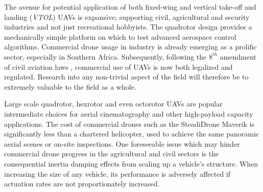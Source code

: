 \par
The avenue for potential application of both fixed-wing and vertical take-off and landing (\emph{VTOL}) UAVs is expansive; supporting civil\cite{civilquadcopter}, agricultural\cite{agriculturequadcopter} and security\cite{videosurveillancequadcopter} industries and not just recreational hobbyists. The quadrotor design provides a mechanically simple platform on which to test advanced aerospace control algorithms. Commercial drone usage in industry is already emerging as a prolific sector, especially in Southern Africa. Subsequently, following the $8^{th}$ amendment of civil aviation laws \cite{dronelaw}, commercial use of UAVs is now both legalized and regulated. Research into any non-trivial aspect of the field will therefore be to extremely valuable to the field as a whole. 
\par
Large scale quadrotor, hexrotor and even octorotor UAVs are popular intermediate choices for aerial cinematography and other high-payload capacity applications. The cost of commercial drones such as the SteadiDrone Maverik \cite{steadidrone} is significantly less than a chartered helicopter, used to achieve the same panoramic aerial scenes or on-site inspections. One foreseeable issue which may hinder commercial drone progress in the agricultural and civil sectors is the consequential inertia damping effects from scaling up a vehicle's structure. When increasing the size of any vehicle, its performance is adversely affected if actuation rates are not proportionately increased.
